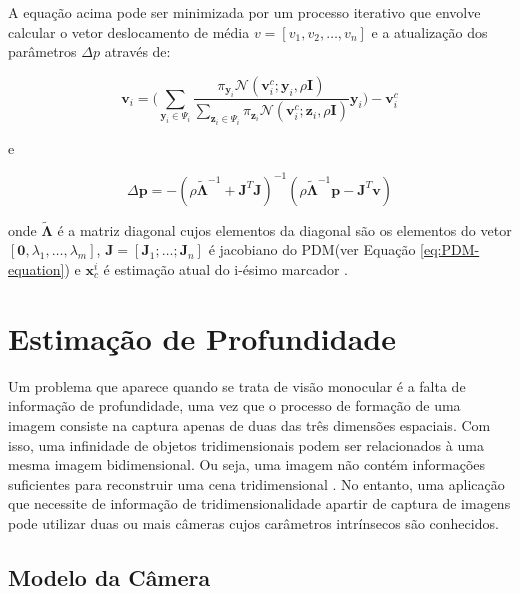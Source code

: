 {A equação acima pode ser minimizada por um processo iterativo que envolve calcular o vetor deslocamento de média $v = [v_1, v_2, \ldots, v_n]$ e a atualização dos parâmetros $\Delta p$ através de:

\begin{equation}
\textbf{v}_i = \Bigg(\sum\limits_{\textbf{y}_i \in \Psi_i} \frac{\pi_{\textbf{y}_i}\mathcal{N}(\textbf{v}_i^c;\textbf{y}_i,\rho\textbf{I})}{\sum\nolimits_{\textbf{z}_i \in \Psi_i} \pi_{\textbf{z}_i}\mathcal{N}(\textbf{v}_i^c;\textbf{z}_i,\rho\textbf{I})
}\textbf{y}_i\Bigg) - \textbf{v}_i^c
\label{eq:alg3}
\end{equation}

e

\begin{equation}
\Delta\textbf{p} = -(\rho\tilde{\mathbf{\Lambda}}^{-1} + \textbf{J}^T\textbf{J})^{-1}(\rho\tilde{\mathbf{\Lambda}}^{-1}\textbf{p} - \textbf{J}^T\textbf{v})
\label{eq:alg4}
\end{equation}

onde $\tilde{\mathbf{\Lambda}}$ é a matriz diagonal cujos elementos da diagonal são os elementos do vetor $[\mathbf{0}, \lambda_1, \ldots, \lambda_m]$, $\mathbf{J} = [\mathbf{J}_1; \ldots; \mathbf{J}_n]$ é jacobiano do PDM(ver Equação \ref{eq:PDM-equation}) 
e $\mathbf{x}_c^i$ é estimação atual do i-ésimo marcador .




               
\section{Estimação de Profundidade}

Um problema que aparece quando se trata de visão monocular é a falta de informação de profundidade, uma vez que o processo de formação de uma imagem consiste na captura apenas de duas das três dimensões espaciais. Com isso, uma infinidade de objetos tridimensionais podem ser relacionados à uma mesma imagem bidimensional. Ou seja, uma imagem não contém informações suficientes para reconstruir uma cena tridimensional \cite{bolles1987epipolar}. No entanto, uma aplicação que necessite de informação de tridimensionalidade apartir de captura de imagens pode utilizar duas ou mais câmeras cujos carâmetros intrínsecos são conhecidos.

\subsection{Modelo da Câmera}

}
